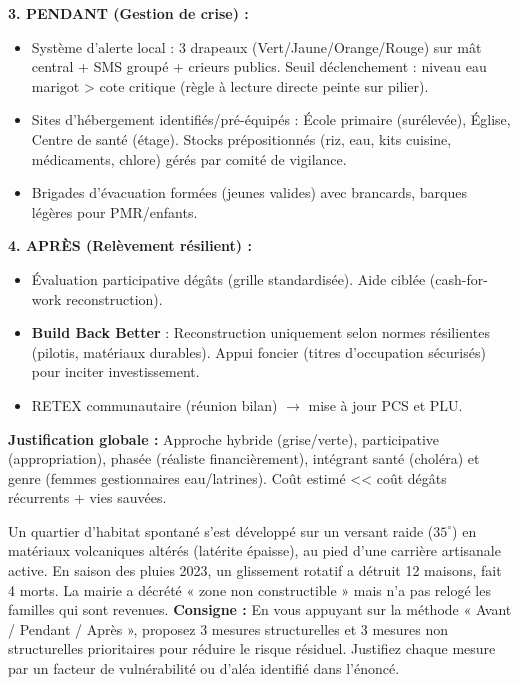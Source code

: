 \documentclass[11pt]{article}
\begin{document}
\begin{exoresolu}
\begin{itemize}
\end{itemize}
\textbf{3. PENDANT (Gestion de crise) :}
\begin{itemize}
    \item Système d'alerte local : 3 drapeaux (Vert/Jaune/Orange/Rouge) sur mât central + SMS groupé + crieurs publics. Seuil déclenchement : niveau eau marigot > cote critique (règle à lecture directe peinte sur pilier).
    \item Sites d'hébergement identifiés/pré-équipés : École primaire (surélevée), Église, Centre de santé (étage). Stocks prépositionnés (riz, eau, kits cuisine, médicaments, chlore) gérés par comité de vigilance.
    \item Brigades d'évacuation formées (jeunes valides) avec brancards, barques légères pour PMR/enfants.
\end{itemize}
\textbf{4. APRÈS (Relèvement résilient) :}
\begin{itemize}
    \item Évaluation participative dégâts (grille standardisée). Aide ciblée (cash-for-work reconstruction).
    \item \textbf{Build Back Better} : Reconstruction uniquement selon normes résilientes (pilotis, matériaux durables). Appui foncier (titres d'occupation sécurisés) pour inciter investissement.
    \item RETEX communautaire (réunion bilan) $\rightarrow$ mise à jour PCS et PLU.
\end{itemize}
\textbf{Justification globale :} Approche hybride (grise/verte), participative (appropriation), phasée (réaliste financièrement), intégrant santé (choléra) et genre (femmes gestionnaires eau/latrines). Coût estimé << coût dégâts récurrents + vies sauvées.
\end{exoresolu}

\begin{exercice}
Un quartier d'habitat spontané s'est développé sur un versant raide ($35^\circ$) en matériaux volcaniques altérés (latérite épaisse), au pied d'une carrière artisanale active. En saison des pluies 2023, un glissement rotatif a détruit 12 maisons, fait 4 morts. La mairie a décrété « zone non constructible » mais n'a pas relogé les familles qui sont revenues.
\textbf{Consigne :} En vous appuyant sur la méthode « Avant / Pendant / Après », proposez 3 mesures structurelles et 3 mesures non structurelles prioritaires pour réduire le risque résiduel. Justifiez chaque mesure par un facteur de vulnérabilité ou d'aléa identifié dans l'énoncé.
\end{exercice}
\end{document}
